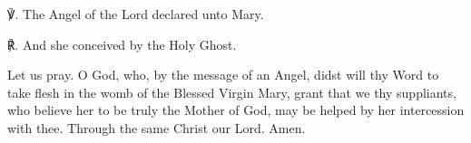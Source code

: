 \begin{otherlanguage}{english}


℣. The Angel of the Lord declared unto Mary.

℟. And she conceived by the Holy Ghost.

Let us pray. 
O God, who, by the message of an Angel, didst will thy Word to take flesh in the womb of the Blessed Virgin Mary, grant that we thy suppliants, who believe her to be truly the Mother of God, may be helped by her intercession with thee. Through the same Christ our Lord. Amen. \end{otherlanguage}